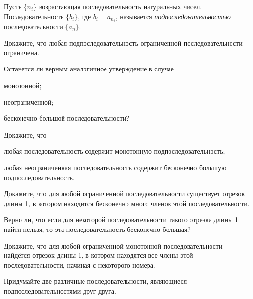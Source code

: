 \documentclass[a4paper, 12pt, num=25]{listok}
\begin{document}
\begin{definition}
	Пусть $\{n_i\}$  возрастающая последовательность натуральных чисел.
	Последовательность $\{b_i\}$, где $b_i = a_{n_i}$, называется \textit{подпоследовательностью} последовательности $\{a_n\}$.
\end{definition}
\begin{problem}
\begin{probparts}
	\item Докажите, что любая подпоследовательность ограниченной последовательности ограничена.
\end{probparts}
	Останется ли верным аналогичное утверждение в случае
	\begin{probparts}[resume]
		\item монотонной;
		\item неограниченной;
		\item бесконечно большой последовательности?
	\end{probparts}
\end{problem}
\begin{problem}
	Докажите, что
	\begin{probparts}
		\item любая последовательность содержит монотонную подпоследовательность;
		\item любая неограниченная последовательность содержит бесконечно большую подпоследовательность.
	\end{probparts}
\end{problem}
\begin{problem}
\begin{probparts}
	\item Докажите, что для любой ограниченной последовательности существует отрезок длины 1,
	в котором находится бесконечно много членов этой последовательности.
	\item Верно ли, что если для некоторой последовательности такого отрезка длины 1 найти нельзя, то эта последовательность  бесконечно большая?
\end{probparts}
\end{problem}
\begin{problem}
	Докажите, что для любой ограниченной монотонной последовательности найдётся отрезок длины 1,
	в котором находятся все члены этой последовательности, начиная с некоторого номера.
\end{problem}
\begin{problem}
	Придумайте две различные последовательности, являющиеся подпоследовательностями друг друга.
\end{problem}
\end{document}
